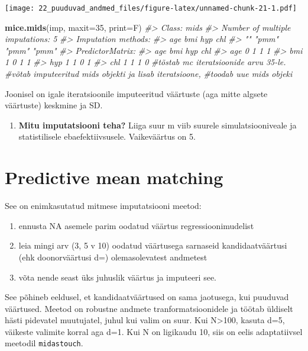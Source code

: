 \documentclass[]{book}
\newenvironment{Shaded}{\begin{snugshade}}{\end{snugshade}}
\newcommand{\KeywordTok}[1]{\textcolor[rgb]{0.13,0.29,0.53}{\textbf{#1}}}
\newcommand{\DataTypeTok}[1]{\textcolor[rgb]{0.13,0.29,0.53}{#1}}
\newcommand{\DecValTok}[1]{\textcolor[rgb]{0.00,0.00,0.81}{#1}}
\newcommand{\CommentTok}[1]{\textcolor[rgb]{0.56,0.35,0.01}{\textit{#1}}}
\newcommand{\NormalTok}[1]{#1}
\providecommand{\tightlist}{%
  \setlength{\itemsep}{0pt}\setlength{\parskip}{0pt}}
\begin{document}
\texttt{[image: 22\_puuduvad\_andmed\_files/figure-latex/unnamed-chunk-21-1.pdf]}

\begin{Shaded}
\begin{Highlighting}[]
\KeywordTok{mice.mids}\NormalTok{(imp, }\DataTypeTok{maxit=}\DecValTok{35}\NormalTok{, }\DataTypeTok{print=}\NormalTok{F) }
\CommentTok{#> Class: mids}
\CommentTok{#> Number of multiple imputations:  5 }
\CommentTok{#> Imputation methods:}
\CommentTok{#>   age   bmi   hyp   chl }
\CommentTok{#>    "" "pmm" "pmm" "pmm" }
\CommentTok{#> PredictorMatrix:}
\CommentTok{#>     age bmi hyp chl}
\CommentTok{#> age   0   1   1   1}
\CommentTok{#> bmi   1   0   1   1}
\CommentTok{#> hyp   1   1   0   1}
\CommentTok{#> chl   1   1   1   0}
\CommentTok{#tõstab mc iteratsioonide arvu 35-le.}
\CommentTok{#võtab imputeeritud mids objekti ja lisab iteratsioone, }
\CommentTok{#toodab uue mids objeki}
\end{Highlighting}
\end{Shaded}

Joonisel on igale iteratsioonile imputeeritud väärtuste (aga mitte
algsete väärtuste) keskmine ja SD.

\begin{enumerate}
\def\labelenumi{\arabic{enumi}.}
\setcounter{enumi}{6}
\tightlist
\item
  \textbf{Mitu imputatsiooni teha?} Liiga suur m viib suurele
  simulatsiooniveale ja statistilisele ebaefektiivsusele. Vaikeväärtus
  on 5.
\end{enumerate}

\section{Predictive mean matching}\label{predictive-mean-matching}

See on enimkasutatud mitmese imputatsiooni meetod:

\begin{enumerate}
\def\labelenumi{\arabic{enumi}.}
\item
  ennusta NA asemele parim oodatud väärtus regressioonimudelist
\item
  leia mingi arv (3, 5 v 10) oodatud väärtusega sarnaseid
  kandidaatväärtusi (ehk doonorväärtusi d=) olemasolevatest andmetest
\item
  võta nende seast üks juhuslik väärtus ja imputeeri see.
\end{enumerate}

See põhineb eeldusel, et kandidaatväärtused on sama jaotusega, kui
puuduvad väärtused. Meetod on robustne andmete tranformatsioonidele ja
töötab üldiselt hästi pidevatel muutujatel, juhul kui valim on suur. Kui
N\textgreater{}100, kasuta d=5, väikeste valimite korral aga d=1. Kui N
on ligikaudu 10, siis on eelis adaptatiivsel meetodil
\texttt{midastouch}.
\end{document}

